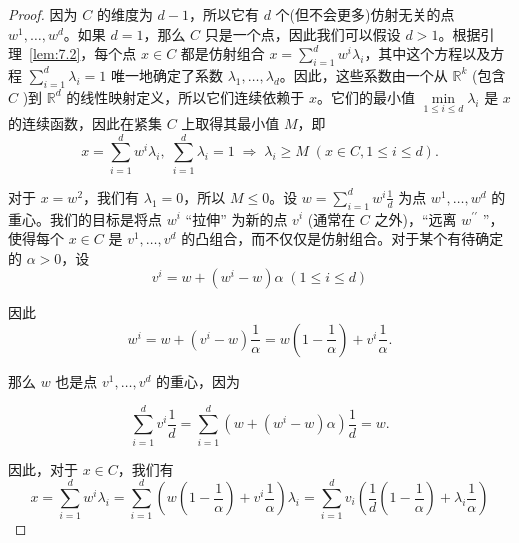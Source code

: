 \begin{proof}
因为 \(C\) 的维度为 \(d - 1\)，所以它有 \(d\) 个(但不会更多)仿射无关的点 \({w}^{1},\ldots,{w}^{d}\)。如果 \(d = 1\)，那么 \(C\) 只是一个点，因此我们可以假设 \(d > 1\)。根据引理~\ref{lem:7.2}，每个点 \(x \in  C\) 都是仿射组合 \(x = \mathop{\sum }\limits_{{i = 1}}^{d}{w}^{i}{\lambda }_{i}\)，其中这个方程以及方程 \(\mathop{\sum }\limits_{{i = 1}}^{d}{\lambda }_{i} = 1\) 唯一地确定了系数 \({\lambda }_{1},\ldots,{\lambda }_{d}\)。因此，这些系数由一个从 \({\mathbb{R}}^{k}\) (包含 \(C\) )到 \({\mathbb{R}}^{d}\) 的线性映射定义，所以它们连续依赖于 \(x\)。它们的最小值 \(\mathop{\min }\limits_{{1 \leq  i \leq  d}}{\lambda }_{i}\) 是 \(x\) 的连续函数，因此在紧集 \(C\) 上取得其最小值 \(M\)，即
\begin{equation}
x = \mathop{\sum }\limits_{{i = 1}}^{d}{w}^{i}{\lambda }_{i},\;\mathop{\sum }\limits_{{i = 1}}^{d}{\lambda }_{i} = 1\; \Rightarrow  \;{\lambda }_{i} \geq  M\;\left( {x \in  C,1 \leq  i \leq  d}\right) .\label{eq:7.14}
\end{equation}

对于 \(x = {w}^{2}\)，我们有 \({\lambda }_{1} = 0\)，所以 \(M \leq  0\)。设 \(w = \mathop{\sum }\limits_{{i = 1}}^{d}{w}^{i}\frac{1}{d}\) 为点 \({w}^{1},\ldots,{w}^{d}\) 的重心。我们的目标是将点 \({w}^{i}\) “拉伸” 为新的点 \({v}^{i}\) (通常在 \(C\) 之外)，“远离 \({w}^{\prime \prime }\) ”，使得每个 \(x \in  C\) 是 \({v}^{1},\ldots,{v}^{d}\) 的凸组合，而不仅仅是仿射组合。对于某个有待确定的 \(\alpha  > 0\)，设
\[
{v}^{i} = w + \left( {{w}^{i} - w}\right) \alpha \;\left( {1 \leq  i \leq  d}\right)
\]

因此
\[
{w}^{i} = w + \left( {{v}^{i} - w}\right) \frac{1}{\alpha } = w\left( {1 - \frac{1}{\alpha }}\right)  + {v}^{i}\frac{1}{\alpha }.
\]

那么 \(w\) 也是点 \({v}^{1},\ldots,{v}^{d}\) 的重心，因为

\[
\mathop{\sum }\limits_{{i = 1}}^{d}{v}^{i}\frac{1}{d} = \mathop{\sum }\limits_{{i = 1}}^{d}\left( {w + \left( {{w}^{i} - w}\right) \alpha }\right) \frac{1}{d} = w.
\]

因此，对于 \(x \in  C\)，我们有
\begin{equation}
x = \mathop{\sum }\limits_{{i = 1}}^{d}{w}^{i}{\lambda }_{i} = \mathop{\sum }\limits_{{i = 1}}^{d}\left( {w\left( {1 - \frac{1}{\alpha }}\right)  + {v}^{i}\frac{1}{\alpha }}\right) {\lambda }_{i} = \mathop{\sum }\limits_{{i = 1}}^{d}{v}_{i}\left( {\frac{1}{d}\left( {1 - \frac{1}{\alpha }}\right)  + {\lambda }_{i}\frac{1}{\alpha }}\right)\label{eq:7.15}
\end{equation}


\end{proof}
